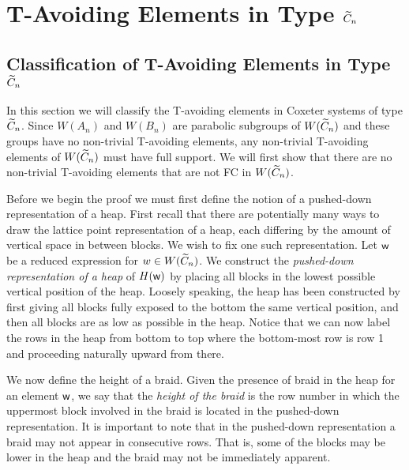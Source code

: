 \chapter{T-Avoiding Elements in Type $\widetilde{C}_n$}\label{chap:Cn}



\section{Classification of T-Avoiding Elements in Type $\widetilde{C}_n$}\label{sec:TAC}

In this section we will classify the T-avoiding elements in Coxeter systems of type $\widetilde{C}_n$. Since $W(A_n)$ and $W(B_n)$ are parabolic subgroups of $W(\widetilde{C}_n)$ and these groups have no non-trivial T-avoiding elements,  any non-trivial T-avoiding elements of $W(\widetilde{C}_n)$ must have full support. We will first show that there are no non-trivial T-avoiding elements that are not FC in $W(\widetilde{C}_n)$.

Before we begin the proof we must first define the notion of a pushed-down representation of a heap. First recall that there are potentially many ways to draw the lattice point representation of a heap, each differing by the amount of vertical space in between blocks. We wish to fix one such representation. Let $\mathsf{w}$ be a reduced expression for $w \in W(\widetilde{C}_n)$. We construct the \emph{pushed-down representation of a heap} of $H(\mathsf{w})$ by placing all blocks in the lowest possible vertical position of the heap. Loosely speaking, the heap has been constructed by first giving all blocks fully exposed to the bottom the same vertical position, and then all blocks are as low as possible in the heap. Notice that we can now label the rows in the heap from bottom to top where the bottom-most row is row 1 and proceeding naturally upward from there. 

We now define the height of a braid. Given the presence of braid in the heap for an element $\mathsf{w}$, we say that the \emph{height of the braid} is the row number in which the uppermost block involved in the braid is located in the pushed-down representation. It is important to note that in the pushed-down representation a braid may not appear in consecutive rows. That is, some of the blocks may be lower in the heap and the braid may not be immediately apparent. 


